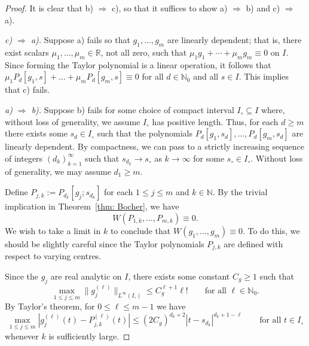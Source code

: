 \documentclass[reqno]{amsart}
\numberwithin{equation}{section}
\newcommand{\N}{\mathbb{N}}
\newcommand{\R}{\mathbb{R}}
\theoremstyle{plain}
\theoremstyle{definition}
\begin{document}
\begin{proof} It is clear that b) $\Rightarrow$ c), so that it suffices to show a) $\Rightarrow$ b) and c) $\Rightarrow$ a).\medskip

\noindent \textit{c) $\Rightarrow$ a).} Suppose a) fails so that $g_1,\dots, g_m$ are linearly dependent; that is, there exist scalars $\mu_1, \dots, \mu_m \in \R$, not all zero, such that $\mu_1 g_1 + \cdots + \mu_m g_m \equiv 0$ on $I$. Since forming the Taylor polynomial is a linear operation, it follows that $\mu_1P_d[g_1,s] +  \dots + \mu_mP_d[g_m,s] \equiv 0$ for all $d \in \N_0$ and all $s \in I$. This implies that c) fails.\medskip

\noindent \textit{a) $\Rightarrow$ b).} Suppose b) fails for some choice of compact interval $I_{\circ} \subseteq I$ where, without loss of generality, we assume $I_{\circ}$ has positive length. Thus, for each $d \geq m$ there exists some $s_d \in I_{\circ}$ such that the polynomials $P_d[g_1,s_d], \ldots, P_d[g_m,s_d]$ are linearly dependent. By compactness, we can pass to a strictly increasing sequence of integers $(d_k)_{k=1}^{\infty}$ such that $s_{d_k} \to s_{\circ}$ as $k \to \infty$ for some $s_{\circ} \in I_{\circ}$. Without loss of generality, we may assume $d_1 \geq m$.

Define $P_{j,k} := P_{d_k}[g_j; s_{d_k}]$ for each $1 \leq j \leq m$ and $k \in \N$. By the trivial implication in Theorem~\ref{thm: Bocher}, we have
\begin{equation*}
W(P_{1,k}, \dots, P_{m,k}) \equiv 0.
\end{equation*}
We wish to take a limit in $k$ to conclude that $W(g_1, \dots, g_m) \equiv 0$. To do this, we should be slightly careful since the Taylor polynomials $P_{j,k}$ are defined with respect to varying centres. 

Since the $g_j$ are real analytic on $I$, there exists some constant $C_g \geq 1$ such that
\begin{equation*}
   \max_{1 \leq j \leq m} \|g_j^{(\ell)}\|_{L^{\infty}(I_{\circ})} \leq C_g^{\ell+1} \ell! \qquad \textrm{for all $\ell \in \N_0$.}
\end{equation*}
By Taylor's theorem, for $0 \leq \ell \leq m-1$ we have
\begin{equation}\label{eq: lin ind 1}
\max_{1 \leq j \leq m} |g_j^{(\ell)}(t) - P_{j,k}^{(\ell)}(t)| \leq (2 C_g)^{d_k+2}|t-s_{d_k}|^{d_k+1 -\ell} \qquad \textrm{for all $t \in I_{\circ}$}
\end{equation}
whenever $k$ is sufficiently large. 


\end{proof}
\end{document}
